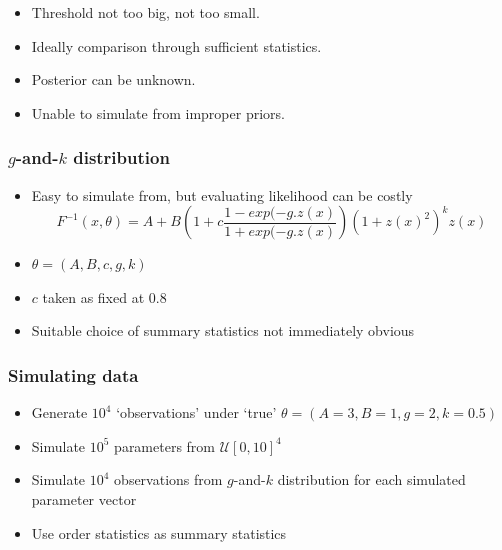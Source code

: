 \documentclass{beamer}
\begin{document}
\begin{frame}
\begin{itemize}
\item Threshold not too big, not too small.
\item Ideally comparison through sufficient statistics.
\item Posterior can be unknown.
\item Unable to simulate from improper priors.
\end{itemize}
\end{frame}

\begin{frame}
\frametitle{$g$-and-$k$ distribution}
\begin{itemize}
\item Easy to simulate from, but evaluating likelihood can be costly 
\[
F^{-1}(x, \theta) = A + B\left(1 + c\frac{1-exp(-g.z(x)}{1+exp(-g.z(x)}\right)(1+z(x)^2)^kz(x)
\]
\item $\theta = (A, B, c, g, k)$
\item $c$ taken as fixed at $0.8$
\item Suitable choice of summary statistics not immediately obvious

\end{itemize}
\end{frame}

\begin{frame}
\frametitle{Simulating data}
\begin{itemize}
\item Generate $10^4$ `observations' under `true' $\theta = (A = 3, B = 1, g = 2, k = 0.5)$
\item Simulate $10^5$ parameters from $\mathcal{U}[0,10]^4$
\item Simulate $10^4$ observations from $g$-and-$k$ distribution for each simulated parameter vector
\item Use order statistics as summary statistics
\end{itemize}
\end{frame}
\end{document}

